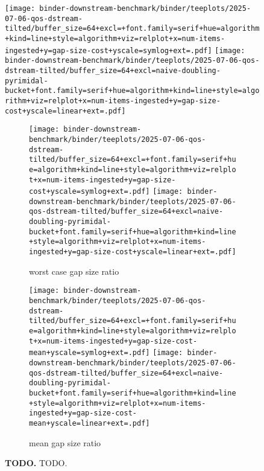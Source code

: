 \begin{figure*}

\texttt{[image: binder-downstream-benchmark/binder/teeplots/2025-07-06-qos-dstream-tilted/buffer\_size=64+excl=+font.family=serif+hue=algorithm+kind=line+style=algorithm+viz=relplot+x=num-items-ingested+y=gap-size-cost+yscale=symlog+ext=.pdf]}%
\texttt{[image: binder-downstream-benchmark/binder/teeplots/2025-07-06-qos-dstream-tilted/buffer\_size=64+excl=naive-doubling-pyrimidal-bucket+font.family=serif+hue=algorithm+kind=line+style=algorithm+viz=relplot+x=num-items-ingested+y=gap-size-cost+yscale=linear+ext=.pdf]}%

\vspace{-5ex}

\begin{subfigure}{\linewidth}
    \centering
    \texttt{[image: binder-downstream-benchmark/binder/teeplots/2025-07-06-qos-dstream-tilted/buffer\_size=64+excl=+font.family=serif+hue=algorithm+kind=line+style=algorithm+viz=relplot+x=num-items-ingested+y=gap-size-cost+yscale=symlog+ext=.pdf]}%
    \texttt{[image: binder-downstream-benchmark/binder/teeplots/2025-07-06-qos-dstream-tilted/buffer\_size=64+excl=naive-doubling-pyrimidal-bucket+font.family=serif+hue=algorithm+kind=line+style=algorithm+viz=relplot+x=num-items-ingested+y=gap-size-cost+yscale=linear+ext=.pdf]}


    \caption{worst case gap size ratio}
    \label{fig:qos:max}
\end{subfigure}

\vspace{0.5ex}

\begin{subfigure}{\linewidth}
    \centering
    \texttt{[image: binder-downstream-benchmark/binder/teeplots/2025-07-06-qos-dstream-tilted/buffer\_size=64+excl=+font.family=serif+hue=algorithm+kind=line+style=algorithm+viz=relplot+x=num-items-ingested+y=gap-size-cost-mean+yscale=symlog+ext=.pdf]}%
    \texttt{[image: binder-downstream-benchmark/binder/teeplots/2025-07-06-qos-dstream-tilted/buffer\_size=64+excl=naive-doubling-pyrimidal-bucket+font.family=serif+hue=algorithm+kind=line+style=algorithm+viz=relplot+x=num-items-ingested+y=gap-size-cost-mean+yscale=linear+ext=.pdf]}

    \vspace{-2ex}

    \caption{mean gap size ratio}
    \label{fig:qos:mean}
\end{subfigure}

\caption{%
\textbf{TODO.}
\small
TODO.
}
\label{fig:qos}

\end{figure*}

